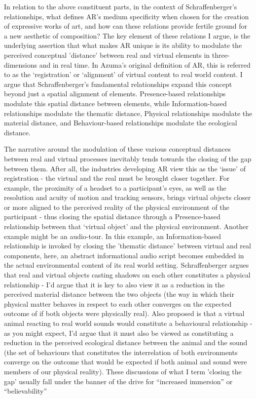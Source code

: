 In relation to the above constituent parts, in the context of Schraffenberger’s relationships, what defines AR’s medium specificity when chosen for the creation of expressive works of art, and how can these relations provide fertile ground for a new aesthetic of composition? The key element of these relations I argue, is the underlying assertion that what makes AR unique is its ability to modulate the perceived conceptual ’distance’ between real and virtual elements in three-dimensions and in real time. In Azuma’s \citep[]{azuma1997} original definition of AR, this is referred to as the ‘registration’ or ‘alignment’ of virtual content to real world content. I argue that Schraffenberger’s fundamental relationships expand this concept beyond just a spatial alignment of elements. Presence-based relationships modulate this spatial distance between elements, while Information-based relationships modulate the thematic distance, Physical relationships modulate the material distance, and Behaviour-based relationships modulate the ecological distance. 

The narrative around the modulation of these various conceptual distances between real and virtual processes inevitably tends towards the closing of the gap between them. After all, the industries developing AR view this as the ‘issue’ of registration - the virtual and the real must be brought closer together. For example, the proximity of a headset to a participant’s eyes, as well as the resolution and acuity of motion and tracking sensors, brings virtual objects closer or more aligned to the perceived reality of the physical environment of the participant - thus closing the spatial distance through a Presence-based relationship between that ‘virtual object’ and the physical environment. Another example might be an audio-tour. In this example, an Information-based relationship is invoked by closing the ’thematic distance’ between virtual and real components, here, an abstract informational audio script becomes embedded in the actual environmental content of its real world setting. Schraffenberger argues that real and virtual objects casting shadows on each other constitutes a physical relationship - I’d argue that it is key to also view it as a reduction in the perceived material distance between the two objects (the way in which their physical matter behaves in respect to each other converges on the expected outcome of if both objects were physically real). Also proposed is that a virtual animal reacting to real world sounds would constitute a behavioural relationship - as you might expect, I’d argue that it must also be viewed as constituting a reduction in the perceived ecological distance between the animal and the sound (the set of behaviours that constitutes the interrelation of both environments converge on the outcome that would be expected if both animal and sound were members of our physical reality). These discussions of what I term ’closing the gap’ usually fall under the banner of the drive for “increased immersion” or “believability”%

